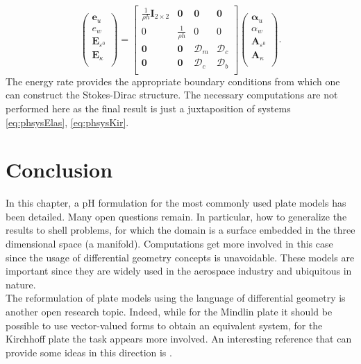 \begin{equation}
\begin{pmatrix}
\bm{e}_u \\
e_w \\
\bm{E}_{\varepsilon^0} \\
\bm{E}_{\kappa} \\
\end{pmatrix}
= 
\begin{bmatrix}
\frac{1}{\rho h}\bm{I}_{2 \times 2} & \bm{0} & \bm{0} &  \bm{0} \\
0 & \frac{1}{\rho h} & 0 & 0  \\
\bm{0} & \bm{0} & \bm{\mathcal{D}}_m & \bm{\mathcal{D}}_c \\
\bm{0} & \bm{0} & \bm{\mathcal{D}}_c & \bm{\mathcal{D}}_b \\
\end{bmatrix}
\begin{pmatrix}
\bm\alpha_u \\
\alpha_w \\
\bm{A}_{\varepsilon^0} \\
\bm{A}_\kappa \\
\end{pmatrix}.
\end{equation}
The energy rate provides the appropriate boundary conditions from which one can construct the Stokes-Dirac structure. The necessary computations are not performed here as the final result is just a juxtaposition of systems \eqref{eq:phsysElas}, \eqref{eq:phsysKir}.


\section{Conclusion}

In this chapter, a pH formulation for the most commonly used plate models has been detailed. Many open questions remain. In particular, how to generalize the results to shell problems, for which the domain is a surface embedded in the three dimensional space (a manifold). Computations get more involved in this case since the usage of differential geometry concepts is unavoidable. These models are important since they are widely used in the aerospace industry and ubiquitous in nature. \\

The reformulation of plate models using the language of differential geometry is another open research topic. Indeed, while for the Mindlin plate it should be possible to use vector-valued forms to obtain an equivalent system, for the Kirchhoff plate the task appears more involved. An interesting reference that can provide some ideas in this direction is \cite{yao2011modeling}. 